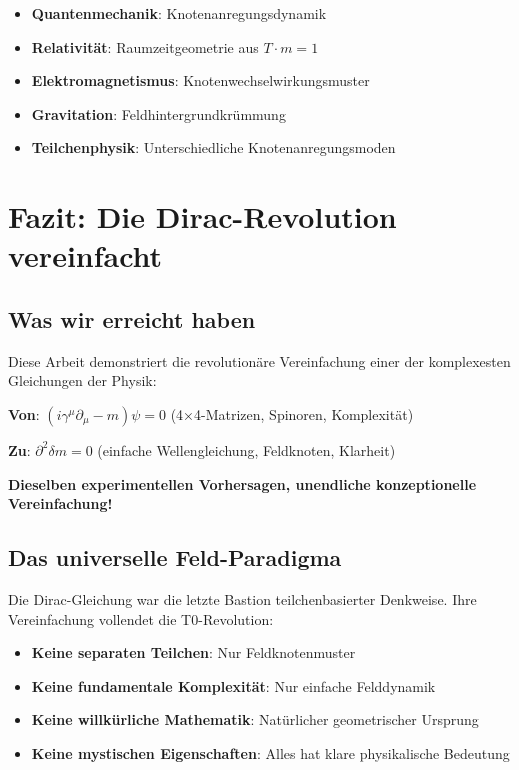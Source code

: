 \documentclass[12pt,a4paper]{article}
\newcommand{\deltam}{\delta m}
\theoremstyle{definition}
\theoremstyle{remark}
\begin{document}
	\begin{itemize}
		\item \textbf{Quantenmechanik}: Knotenanregungsdynamik
		\item \textbf{Relativität}: Raumzeitgeometrie aus $T \cdot m = 1$
		\item \textbf{Elektromagnetismus}: Knotenwechselwirkungsmuster
		\item \textbf{Gravitation}: Feldhintergrundkrümmung
		\item \textbf{Teilchenphysik}: Unterschiedliche Knotenanregungsmoden
	\end{itemize}
	
	\section{Fazit: Die Dirac-Revolution vereinfacht}
	
	\subsection{Was wir erreicht haben}
	
	Diese Arbeit demonstriert die revolutionäre Vereinfachung einer der komplexesten Gleichungen der Physik:
	
	\begin{center}
		\textbf{Von}: $(i\gamma^{\mu}\partial_{\mu} - m)\psi = 0$ (4×4-Matrizen, Spinoren, Komplexität)
		
		\textbf{Zu}: $\partial^2 \deltam = 0$ (einfache Wellengleichung, Feldknoten, Klarheit)
	\end{center}
	
	\textbf{Dieselben experimentellen Vorhersagen, unendliche konzeptionelle Vereinfachung!}
	
	\subsection{Das universelle Feld-Paradigma}
	
	Die Dirac-Gleichung war die letzte Bastion teilchenbasierter Denkweise. Ihre Vereinfachung vollendet die T0-Revolution:
	
	\begin{itemize}
		\item \textbf{Keine separaten Teilchen}: Nur Feldknotenmuster
		\item \textbf{Keine fundamentale Komplexität}: Nur einfache Felddynamik
		\item \textbf{Keine willkürliche Mathematik}: Natürlicher geometrischer Ursprung
		\item \textbf{Keine mystischen Eigenschaften}: Alles hat klare physikalische Bedeutung
	\end{itemize}
	
\end{document}
